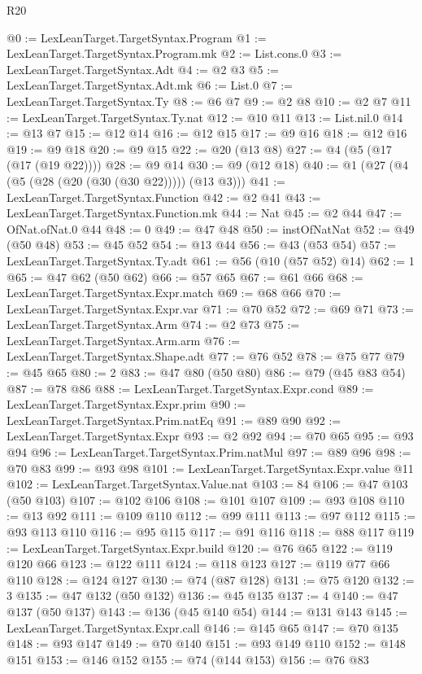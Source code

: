 \begin{lexlean}{R20}
\begin{coremodule}
@0 := LexLeanTarget.TargetSyntax.Program
@1 := LexLeanTarget.TargetSyntax.Program.mk
@2 := List.cons.{0}
@3 := LexLeanTarget.TargetSyntax.Adt
@4 := @2 @3
@5 := LexLeanTarget.TargetSyntax.Adt.mk
@6 := List.{0}
@7 := LexLeanTarget.TargetSyntax.Ty
@8 := @6 @7
@9 := @2 @8
@10 := @2 @7
@11 := LexLeanTarget.TargetSyntax.Ty.nat
@12 := @10 @11
@13 := List.nil.{0}
@14 := @13 @7
@15 := @12 @14
@16 := @12 @15
@17 := @9 @16
@18 := @12 @16
@19 := @9 @18
@20 := @9 @15
@22 := @20 (@13 @8)
@27 := @4 (@5 (@17 (@17 (@19 @22))))
@28 := @9 @14
@30 := @9 (@12 @18)
@40 := @1 (@27 (@4 (@5 (@28 (@20 (@30 (@30 @22))))) (@13 @3)))
@41 := LexLeanTarget.TargetSyntax.Function
@42 := @2 @41
@43 := LexLeanTarget.TargetSyntax.Function.mk
@44 := Nat
@45 := @2 @44
@47 := OfNat.ofNat.{0} @44
@48 := 0
@49 := @47 @48
@50 := instOfNatNat
@52 := @49 (@50 @48)
@53 := @45 @52
@54 := @13 @44
@56 := @43 (@53 @54)
@57 := LexLeanTarget.TargetSyntax.Ty.adt
@61 := @56 (@10 (@57 @52) @14)
@62 := 1
@65 := @47 @62 (@50 @62)
@66 := @57 @65
@67 := @61 @66
@68 := LexLeanTarget.TargetSyntax.Expr.match
@69 := @68 @66
@70 := LexLeanTarget.TargetSyntax.Expr.var
@71 := @70 @52
@72 := @69 @71
@73 := LexLeanTarget.TargetSyntax.Arm
@74 := @2 @73
@75 := LexLeanTarget.TargetSyntax.Arm.arm
@76 := LexLeanTarget.TargetSyntax.Shape.adt
@77 := @76 @52
@78 := @75 @77
@79 := @45 @65
@80 := 2
@83 := @47 @80 (@50 @80)
@86 := @79 (@45 @83 @54)
@87 := @78 @86
@88 := LexLeanTarget.TargetSyntax.Expr.cond
@89 := LexLeanTarget.TargetSyntax.Expr.prim
@90 := LexLeanTarget.TargetSyntax.Prim.natEq
@91 := @89 @90
@92 := LexLeanTarget.TargetSyntax.Expr
@93 := @2 @92
@94 := @70 @65
@95 := @93 @94
@96 := LexLeanTarget.TargetSyntax.Prim.natMul
@97 := @89 @96
@98 := @70 @83
@99 := @93 @98
@101 := LexLeanTarget.TargetSyntax.Expr.value @11
@102 := LexLeanTarget.TargetSyntax.Value.nat
@103 := 84
@106 := @47 @103 (@50 @103)
@107 := @102 @106
@108 := @101 @107
@109 := @93 @108
@110 := @13 @92
@111 := @109 @110
@112 := @99 @111
@113 := @97 @112
@115 := @93 @113 @110
@116 := @95 @115
@117 := @91 @116
@118 := @88 @117
@119 := LexLeanTarget.TargetSyntax.Expr.build
@120 := @76 @65
@122 := @119 @120 @66
@123 := @122 @111
@124 := @118 @123
@127 := @119 @77 @66 @110
@128 := @124 @127
@130 := @74 (@87 @128)
@131 := @75 @120
@132 := 3
@135 := @47 @132 (@50 @132)
@136 := @45 @135
@137 := 4
@140 := @47 @137 (@50 @137)
@143 := @136 (@45 @140 @54)
@144 := @131 @143
@145 := LexLeanTarget.TargetSyntax.Expr.call
@146 := @145 @65
@147 := @70 @135
@148 := @93 @147
@149 := @70 @140
@151 := @93 @149 @110
@152 := @148 @151
@153 := @146 @152
@155 := @74 (@144 @153)
@156 := @76 @83

\end{coremodule}
\end{lexlean}
